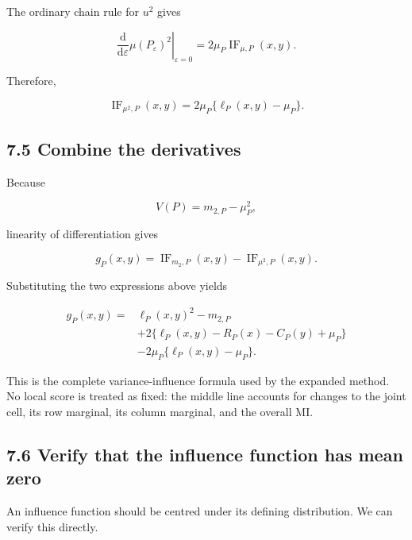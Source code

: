 \documentclass[
  11pt]{article}
\begin{document}
The ordinary chain rule for \(u^2\) gives

\begin{equation}
\left.
\frac{\mathrm d}{\mathrm d\varepsilon}
\mu(P_\varepsilon)^2
\right|_{\varepsilon=0}
=2\mu_P\operatorname{IF}_{\mu,P}(x,y).
\end{equation}

Therefore,

\begin{equation}
\boxed{
\operatorname{IF}_{\mu^2,P}(x,y)
=2\mu_P\{\ell_P(x,y)-\mu_P\}.
}
\end{equation}

\subsection{7.5 Combine the derivatives}\label{combine-the-derivatives}

Because

\begin{equation}
V(P)=m_{2,P}-\mu_P^2,
\end{equation}

linearity of differentiation gives

\begin{equation}
g_P(x,y)
=\operatorname{IF}_{m_2,P}(x,y)
-\operatorname{IF}_{\mu^2,P}(x,y).
\end{equation}

Substituting the two expressions above yields

\begin{equation}
\boxed{
\begin{aligned}
g_P(x,y)={}&
\ell_P(x,y)^2-m_{2,P}\\
&+2\{\ell_P(x,y)-R_P(x)-C_P(y)+\mu_P\}\\
&-2\mu_P\{\ell_P(x,y)-\mu_P\}.
\end{aligned}
}
\end{equation}

This is the complete variance-influence formula used by the expanded
method. No local score is treated as fixed: the middle line accounts for
changes to the joint cell, its row marginal, its column marginal, and
the overall MI.

\subsection{7.6 Verify that the influence function has mean
zero}\label{verify-that-the-influence-function-has-mean-zero}

An influence function should be centred under its defining distribution.
We can verify this directly.
\end{document}
